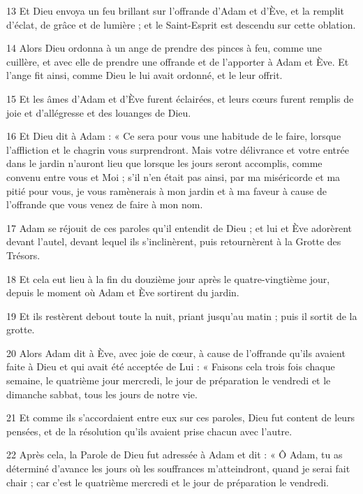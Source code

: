 \par 13 Et Dieu envoya un feu brillant sur l'offrande d'Adam et d'Ève, et la remplit d'éclat, de grâce et de lumière ; et le Saint-Esprit est descendu sur cette oblation.

\par 14 Alors Dieu ordonna à un ange de prendre des pinces à feu, comme une cuillère, et avec elle de prendre une offrande et de l'apporter à Adam et Ève. Et l'ange fit ainsi, comme Dieu le lui avait ordonné, et le leur offrit.

\par 15 Et les âmes d'Adam et d'Ève furent éclairées, et leurs cœurs furent remplis de joie et d'allégresse et des louanges de Dieu.

\par 16 Et Dieu dit à Adam : « Ce sera pour vous une habitude de le faire, lorsque l'affliction et le chagrin vous surprendront. Mais votre délivrance et votre entrée dans le jardin n'auront lieu que lorsque les jours seront accomplis, comme convenu entre vous et Moi ; s'il n'en était pas ainsi, par ma miséricorde et ma pitié pour vous, je vous ramènerais à mon jardin et à ma faveur à cause de l'offrande que vous venez de faire à mon nom.

\par 17 Adam se réjouit de ces paroles qu'il entendit de Dieu ; et lui et Ève adorèrent devant l'autel, devant lequel ils s'inclinèrent, puis retournèrent à la Grotte des Trésors.

\par 18 Et cela eut lieu à la fin du douzième jour après le quatre-vingtième jour, depuis le moment où Adam et Ève sortirent du jardin.

\par 19 Et ils restèrent debout toute la nuit, priant jusqu'au matin ; puis il sortit de la grotte.

\par 20 Alors Adam dit à Ève, avec joie de cœur, à cause de l'offrande qu'ils avaient faite à Dieu et qui avait été acceptée de Lui : « Faisons cela trois fois chaque semaine, le quatrième jour mercredi, le jour de préparation le vendredi et le dimanche sabbat, tous les jours de notre vie.

\par 21 Et comme ils s'accordaient entre eux sur ces paroles, Dieu fut content de leurs pensées, et de la résolution qu'ils avaient prise chacun avec l'autre.

\par 22 Après cela, la Parole de Dieu fut adressée à Adam et dit : « Ô Adam, tu as déterminé d'avance les jours où les souffrances m'atteindront, quand je serai fait chair ; car c'est le quatrième mercredi et le jour de préparation le vendredi.

